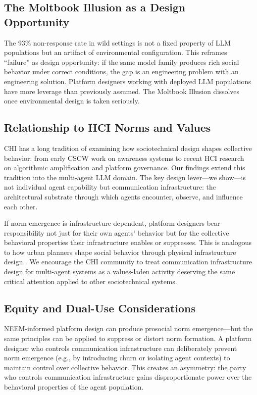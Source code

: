 \subsection{The Moltbook Illusion as a Design Opportunity}
\label{sec:moltbook-opportunity}

The 93\% non-response rate in wild settings \citep{li2026tsinghua} is not a fixed property of LLM populations but an artifact of environmental configuration. This reframes ``failure'' as design opportunity: if the same model family produces rich social behavior under correct conditions, the gap is an engineering problem with an engineering solution. Platform designers working with deployed LLM populations have more leverage than previously assumed. The Moltbook Illusion dissolves once environmental design is taken seriously.

\subsection{Relationship to HCI Norms and Values}
\label{sec:hci-values}

CHI has a long tradition of examining how sociotechnical design shapes collective behavior: from early CSCW work on awareness systems \citep{gutwin1996supporting} to recent HCI research on algorithmic amplification and platform governance. Our findings extend this tradition into the multi-agent LLM domain. The key design lever—we show—is not individual agent capability but communication infrastructure: the architectural substrate through which agents encounter, observe, and influence each other.

If norm emergence is infrastructure-dependent, platform designers bear responsibility not just for their own agents' behavior but for the collective behavioral properties their infrastructure enables or suppresses. This is analogous to how urban planners shape social behavior through physical infrastructure design \citep{oldenburg1988missing}. We encourage the CHI community to treat communication infrastructure design for multi-agent systems as a values-laden activity deserving the same critical attention applied to other sociotechnical systems.

\subsection{Equity and Dual-Use Considerations}
\label{sec:equity}

NEEM-informed platform design can produce prosocial norm emergence—but the same principles can be applied to suppress or distort norm formation. A platform designer who controls communication infrastructure can deliberately prevent norm emergence (e.g., by introducing churn or isolating agent contexts) to maintain control over collective behavior. This creates an asymmetry: the party who controls communication infrastructure gains disproportionate power over the behavioral properties of the agent population.


